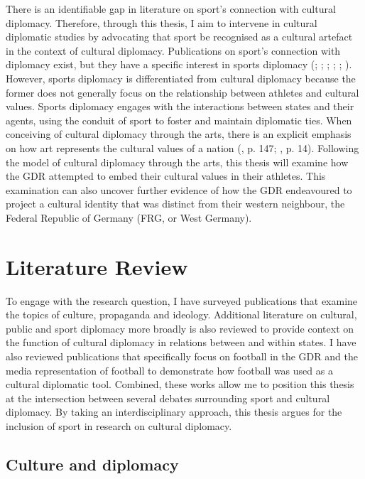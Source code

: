 There is an identifiable gap in literature on sport’s connection with cultural diplomacy. Therefore, through this thesis, I aim to intervene in cultural diplomatic studies by advocating that sport be recognised as a cultural artefact in the context of cultural diplomacy. Publications on sport’s connection with diplomacy exist, but they have a specific interest in sports diplomacy (\cite{holt1999}; \cite{tomlinson2016}; \cite{cooley2018}; \cite{murray2018}; \cite{rowe2018}; \cite{shuman2018}). However, sports diplomacy is differentiated from cultural diplomacy because the former does not generally focus on the relationship between athletes and cultural values. Sports diplomacy engages with the interactions between states and their agents, using the conduit of sport to foster and maintain diplomatic ties. When conceiving of cultural diplomacy through the arts, there is an explicit emphasis on how art represents the cultural values of a nation (\cite{gonçalves2016}, p. 147; \cite{johnson2016}, p. 14). Following the model of cultural diplomacy through the arts, this thesis will examine how the GDR attempted to embed their cultural values in their athletes. This examination can also uncover further evidence of how the GDR endeavoured to project a cultural identity that was distinct from their western neighbour, the Federal Republic of Germany (FRG, or West Germany).

\newpage
\section*{Literature Review}

To engage with the research question, I have surveyed publications that examine the topics of culture, propaganda and ideology. Additional literature on cultural, public and sport diplomacy more broadly is also reviewed to provide context on the function of cultural diplomacy in relations between and within states. I have also reviewed publications that specifically focus on football in the GDR and the media representation of football to demonstrate how football was used as a cultural diplomatic tool. Combined, these works allow me to position this thesis at the intersection between several debates surrounding sport and cultural diplomacy. By taking an interdisciplinary approach, this thesis argues for the inclusion of sport in research on cultural diplomacy.

\subsection*{Culture and diplomacy}

